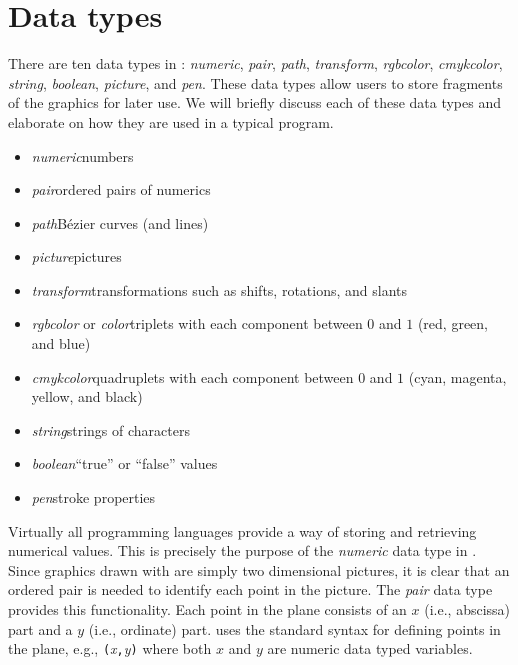 \section{Data types}
\label{sec:datatypes}

There are ten data types in \MP{}: \textit{numeric}, \textit{pair},
\textit{path}, \textit{transform}, \textit{rgbcolor},
\textit{cmykcolor}, \textit{string}, \textit{boolean}, \textit{picture},
and \textit{pen}.  These data types allow users to store fragments of
the graphics for later use.  We will briefly discuss each of these data
types and elaborate on how they are used in a typical \MP{} program.

\renewcommand{\labelitemi}{$\diamond$}
\begin{itemize}
\item \textit{numeric}\Dash numbers
\item \textit{pair}\Dash ordered pairs of numerics
\item \textit{path}\Dash B\'{e}zier curves (and lines)
\item \textit{picture}\Dash pictures
\item \textit{transform}\Dash transformations such as shifts, rotations,
  and slants
\item \textit{rgbcolor} or \textit{color}\Dash triplets with each
  component between $0$ and $1$ (red, green, and blue)
\item \textit{cmykcolor}\Dash quadruplets with each component between
  $0$ and $1$ (cyan, magenta, yellow, and black)
\item \textit{string}\Dash strings of characters
\item \textit{boolean}\Dash ``true'' or ``false'' values
\item \textit{pen}\Dash stroke properties
\end{itemize}

Virtually all programming languages provide a way of storing and
retrieving numerical values.  This is precisely the purpose of the
\textit{numeric} data type in \MP.  Since graphics drawn with \MP{} are
simply two dimensional pictures, it is clear that an ordered pair is
needed to identify each point in the picture.  The \textit{pair} data
type provides this functionality.  Each point in the plane consists of
an $x$ (i.e., abscissa) part and a $y$ (i.e., ordinate) part.  \MP{}
uses the standard syntax for defining points in the plane, e.g.,
\texttt{(}\textit{x}\texttt{,}\textit{y}\texttt{)} where both $x$ and
$y$ are numeric data typed variables.

